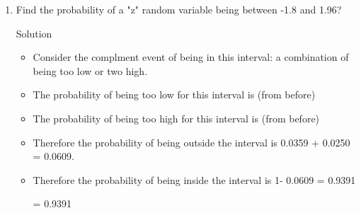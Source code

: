 \documentclass[a4paper,12pt]{article}
\begin{document}
\begin{enumerate}

\item 
Find the probability of a "z" random variable being between -1.8 and 1.96?

\begin{framed}
Solution 
\begin{itemize}


\item Consider the complment event of being in this interval: a combination of being too low or two high. 

\item The probability of being too low for this interval is    (from before)

\item The probability of being too high for this interval is    (from before)

\item Therefore the probability of being outside the interval is  0.0359 + 0.0250 = 0.0609.

\item Therefore the probability of being inside the interval is 1- 0.0609 = 0.9391

  = 0.9391
\end{itemize}

\end{framed}



\end{enumerate}
\end{document}
